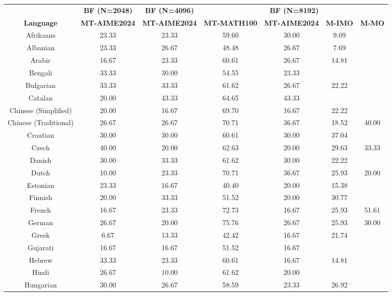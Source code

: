 \begin{table*}[]
\centering
\fontsize{7}{10} \selectfont
\begin{tabular}{c|c|c|cccc}
\toprule
 & \textbf{BF (N=2048)} & \textbf{BF (N=4096)} & \multicolumn{4}{c}{\textbf{BF (N=8192)}} \\ \cmidrule{2-7}
\multirow{-2}{*}{\textbf{Language}} & \multicolumn{1}{c|}{\textbf{MT-AIME2024}} & \multicolumn{1}{c|}{\textbf{MT-AIME2024}} & \textbf{MT-MATH100} & \textbf{MT-AIME2024} & \textbf{M-IMO} & \textbf{M-MO} \\ \midrule
Afrikaans & 23.33 & 23.33 & 59.60 & 30.00 & 9.09 &  \\
Albanian & 23.33 & 26.67 & 48.48 & 26.67 & 7.69 &  \\
Arabic & 16.67 & 23.33 & 60.61 & 26.67 & 14.81 &  \\
Bengali & 33.33 & 30.00 & 54.55 & 23.33 & \multicolumn{1}{l}{} &  \\
Bulgarian & 33.33 & 33.33 & 61.62 & 26.67 & 22.22 &  \\
Catalan & 20.00 & 43.33 & 64.65 & 43.33 & \multicolumn{1}{l}{} &  \\
Chinese (Simplified) & 20.00 & 16.67 & 69.70 & 16.67 & 22.22 &  \\
Chinese (Traditional) & 26.67 & 26.67 & 70.71 & 36.67 & 18.52 & \multirow{-2}{*}{40.00} \\
Croatian & 30.00 & 30.00 & 60.61 & 30.00 & 37.04 &  \\
Czech & 40.00 & 20.00 & 62.63 & 20.00 & 29.63 & 33.33 \\
Danish & 30.00 & 33.33 & 61.62 & 30.00 & 22.22 &  \\
Dutch & 10.00 & 23.33 & 70.71 & 36.67 & 25.93 & 20.00 \\
Estonian & 23.33 & 16.67 & 40.40 & 20.00 & 15.38 &  \\
Finnish & 20.00 & 33.33 & 51.52 & 20.00 & 30.77 &  \\
French & 16.67 & 23.33 & 72.73 & 16.67 & 25.93 & 51.61 \\
German & 26.67 & 20.00 & 75.76 & 26.67 & 25.93 & 30.00 \\
Greek & 6.67 & 13.33 & 42.42 & 16.67 & 21.74 &  \\
Gujarati & 16.67 & 16.67 & 51.52 & 16.67 & \multicolumn{1}{l}{} &  \\
Hebrew & 33.33 & 23.33 & 60.61 & 16.67 & 14.81 &  \\
Hindi & 26.67 & 10.00 & 61.62 & 20.00 & \multicolumn{1}{l}{} &  \\
Hungarian & 30.00 & 26.67 & 58.59 & 23.33 & 26.92 &  \\

\end{tabular}
\end{table*}
